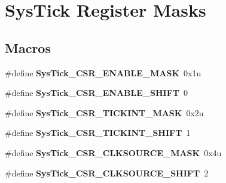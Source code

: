 \hypertarget{group___sys_tick___register___masks}{}\section{Sys\+Tick Register Masks}
\label{group___sys_tick___register___masks}
\subsection*{Macros}
\begin{DoxyCompactItemize}
\item 
\mbox{\label{group___sys_tick___register___masks_gac780b47ad7830f8b054650cf9ae10600}} 
\#define {\bfseries Sys\+Tick\+\_\+\+C\+S\+R\+\_\+\+E\+N\+A\+B\+L\+E\+\_\+\+M\+A\+SK}~0x1u
\item 
\mbox{\label{group___sys_tick___register___masks_ga0f710afc23630b3797a50a76beec3418}} 
\#define {\bfseries Sys\+Tick\+\_\+\+C\+S\+R\+\_\+\+E\+N\+A\+B\+L\+E\+\_\+\+S\+H\+I\+FT}~0
\item 
\mbox{\label{group___sys_tick___register___masks_ga8b51f1d83c7a482e111b09e4c5964a2b}} 
\#define {\bfseries Sys\+Tick\+\_\+\+C\+S\+R\+\_\+\+T\+I\+C\+K\+I\+N\+T\+\_\+\+M\+A\+SK}~0x2u
\item 
\mbox{\label{group___sys_tick___register___masks_ga7fc911092251c68f56bc4d2e68ffa0b2}} 
\#define {\bfseries Sys\+Tick\+\_\+\+C\+S\+R\+\_\+\+T\+I\+C\+K\+I\+N\+T\+\_\+\+S\+H\+I\+FT}~1
\item 
\mbox{\label{group___sys_tick___register___masks_ga7e5a1e63ec805119d87e8584a2404831}} 
\#define {\bfseries Sys\+Tick\+\_\+\+C\+S\+R\+\_\+\+C\+L\+K\+S\+O\+U\+R\+C\+E\+\_\+\+M\+A\+SK}~0x4u
\item 
\mbox{\label{group___sys_tick___register___masks_ga99922ae5d9a4c34aa9e2c1673c65d8a4}} 
\#define {\bfseries Sys\+Tick\+\_\+\+C\+S\+R\+\_\+\+C\+L\+K\+S\+O\+U\+R\+C\+E\+\_\+\+S\+H\+I\+FT}~2
\item 
\mbox{\label{group___sys_tick___register___masks_ga5ae827629fd47e5a050f706576f7b425}} 

\end{DoxyCompactItemize}

